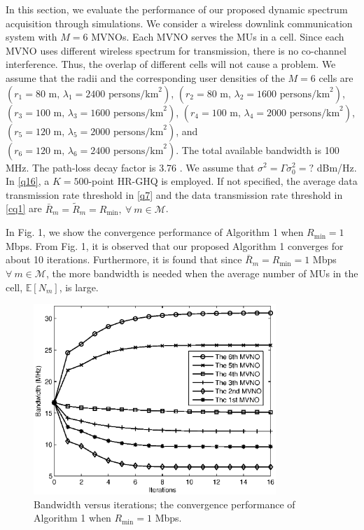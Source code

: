 \documentclass[journal]{IEEEtran}
\begin{document}
In this section, we evaluate the performance of our proposed dynamic spectrum acquisition through simulations. We consider a wireless downlink communication system with $M=6$ MVNOs. Each MVNO serves the MUs in a cell. Since each MVNO uses different wireless spectrum for transmission, there is no co-channel interference. Thus, the overlap of different cells will not cause a problem. We assume that the radii and the corresponding user densities of the $M=6$ cells are $(r_1 = 80\mbox{ m, }\lambda_1 = 2400\mbox{ persons/km}^2)$, $(r_2 = 80\mbox{ m, }\lambda_2 = 1600\mbox{ persons/km}^2)$, $(r_3 = 100\mbox{ m, }\lambda_3 = 1600\mbox{ persons/km}^2)$, $(r_4 = 100\mbox{ m, }\lambda_4 = 2000\mbox{ persons/km}^2)$, $(r_5 = 120\mbox{ m, }\lambda_5 = 2000\mbox{ persons/km}^2)$, and $(r_6 = 120\mbox{ m, }\lambda_6 = 2400\mbox{ persons/km}^2)$. The total available bandwidth is 100 MHz. The path-loss decay factor is 3.76 \cite{3GPP2}. We assume that $\sigma^2=\Gamma\sigma_0^2=?$ dBm/Hz. In \eqref{q16}, a $K=500$-point HR-GHQ is employed. If not specified, the average data transmission rate threshold in \eqref{q7} and the data transmission rate threshold in \eqref{cq1} are $\bar{R}_m =\tilde{R}_m=R_{\min},\ \forall\ m\in\mathcal{M}$.

In Fig. 1, we show the convergence performance of Algorithm 1 when $R_{\min}=1$ Mbps. From Fig. 1, it is observed that our proposed Algorithm 1
converges for about 10 iterations. Furthermore, it is found that since $\bar{R}_m=R_{\min}=1$ Mbps $\forall\ m\in\mathcal{M}$, the more bandwidth
is needed when the average number of MUs in the cell, $\mathbb{E}[N_m]$, is large.

\begin{figure}
\centering
\includegraphics[width=3.6in]{fig1.eps}
\caption{Bandwidth versus iterations; the convergence performance of Algorithm 1 when $R_{\min}=1$ Mbps.}
\end{figure}
\end{document}
